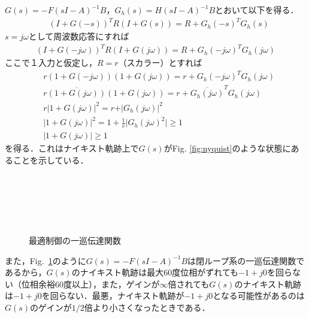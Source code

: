 $G(s)= - F (sI - A)^{-1} B$，$G_h(s)= H (sI - A)^{-1} B$とおいて以下を得る．
\begin{align}
	&
	(I+ G(-s))^T R (I + G(s))
		= R + G_h(-s)^T G_h(s)
\nonumber
\end{align}
$s= j \omega$として周波数応答にすれば
\begin{align}
	(I+ G(-j \omega ))^T R (I + G(j \omega))
		= R + G_h(-j \omega)^T G_h(j \omega)
\nonumber
\end{align}
ここで１入力と仮定し，$R=r$（スカラー）とすれば
\begin{align}
	&
	r (1+ G(-j \omega )) (1 + G(j \omega))
		= r + G_h(-j \omega)^T G_h(j \omega)
\nonumber\\
	&
	r \overline{(1+ G(j \omega ))}(1 + G(j \omega))
		= r + \overline{G_h(j \omega)}^T G_h(j \omega)
\nonumber \\
	&
	r \vert 1 + G(j \omega) \vert^2
		= r + \vert G_h(j \omega) \vert^2
\nonumber \\
	&
	 \vert 1 + G(j \omega) \vert^2
		= 1 + \frac{1}{r} \vert G_h(j \omega)^2 \vert \geq 1
\\
	&
	 \vert 1 + G(j \omega) \vert
		\geq 1
\end{align}
を得る．これはナイキスト軌跡上で$G(s)$がFig. \ref{fig:nyquist}のような状態にあることを示している．

\begin{figure}[bht]
 \begin{center}
\begin{minipage}[c]{7cm}
 \begin{center}
  \caption{最適制御のナイキスト軌跡}
  \label{fig:nyquist}
 \end{center}
\end{minipage}
\ \ \ 
\begin{minipage}[c]{7cm}
 \begin{center}
  \caption{最適制御の一巡伝達関数}
  \label{fig:nyquist_block}
 \end{center}
\end{minipage}
 \end{center}
\end{figure}

また，Fig.~\ref{fig:nyquist_block}のように$G(s)= - F (sI - A)^{-1} B$は閉ループ系の一巡伝達関数であるから，$G(s)$のナイキスト軌跡は最大60度位相がずれても$-1+j0$を回らない（位相余裕60度以上），また，ゲインが$\infty$倍されても$G(s)$のナイキスト軌跡は$-1+j0$を回らない．最悪，ナイキスト軌跡が$-1+j0$となる可能性があるのは$G(s)$のゲインが$1/2$倍より小さくなったときである．

